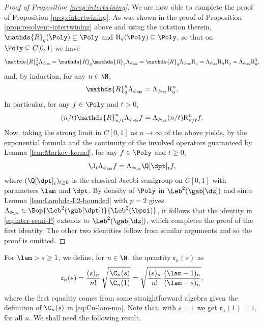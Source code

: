 \begin{proof}[Proof of Proposition \ref{prop:intertwining}]
We are now able to complete the proof of Proposition \ref{prop:intertwining}. As was shown in the proof of
Proposition \ref{prop:resolvent-intertwining} above and using the notation therein, $\mathds{R}_q(\Poly) \subseteq \Poly$ and $\mathrm{R}_q(\Poly) \subseteq \Poly$, so that on $\Poly \subseteq C[0,1]$ we have
\begin{equation*}
\mathds{R}_q^2 \Lambda_{\phi_{\dz}} = \mathds{R}_q\mathds{R}_q \Lambda_{\phi_{\dz}} = \mathds{R}_q \Lambda_{\phi_{\dz}} \mathrm{R}_q = \Lambda_{\phi_{\dz}} \mathrm{R}_q \mathrm{R}_q = \Lambda_{\phi_{\dz}} \mathrm{R}_q^2,
\end{equation*}
and, by induction, for any $n \in \N$,
\begin{equation*}
\mathds{R}_q^n \Lambda_{\phi_{\dz}} = \Lambda_{\phi_{\dz}} \mathrm{R}_q^n.
\end{equation*}
In particular, for any $f \in \Poly$ and $t > 0$,
\begin{equation*}
(n/t)\mathds{R}_{n/t}^n \Lambda_{\phi_{\dz}} f = \Lambda_{\phi_{\dz}} (n/t)\mathrm{R}_{n/t}^n f.
\end{equation*}
Now, taking the strong limit in $C[0,1]$ as $n\to\infty$ of the above yields, by the exponential formula \cite[Th.\,8.3]{pazy:1983} and the continuity of the involved operators guaranteed by Lemma \ref{lem:Markov-kernel}, for any $f \in \Poly$ and $t \geq 0$,
\begin{equation}
\label{eq:inter-semi-P}
\J_t \Lambda_{\phi_{\dz}} f = \Lambda_{\phi_{\dz}} \Q[\dpt]_t f,
\end{equation}
where $(\Q[\dpt]_t)_{t \geq 0}$ is the classical Jacobi semigroup on $C[0,1]$ with parameters $\lam$ and $\dpt$. By density of $\Poly$ in $\Leb^2(\gab[\dz])$ and since Lemma \ref{lem:Lambda-L2-bounded} with $p=2$ gives $\Lambda_{\phi_{\dz}} \in \Bop{\Leb^2(\gab[\dpt])}{\Leb^2(\bpsi)}$, it follows that the identity in \eqref{eq:inter-semi-P} extends to $\Leb^2(\gab[\dz])$, which completes the proof of the first identity. The other two identities follow from similar arguments and so the proof is omitted.
\end{proof}

For $\lam > s \geq 1$, we define, for $n \in \N$, the quantity $\mathfrak{c}_n(s)$ as
\begin{equation}
\label{eq:defn-cn}
\mathfrak{c}_n(s) = \frac{(s)_n}{n!}\, \sqrt{\frac{\C_n(s)}{\C_n(1)}} = \sqrt{\frac{(s)_n}{n!}\,\frac{(\lam-1)_n}{(\lam-s)_n}},
\end{equation}
where the first equality comes from some straightforward algebra given the definition of $\C_n(s)$ in \eqref{eq:Cn-lam-mo}. Note that, with $s=1$ we get $\mathfrak{c}_n(1) = 1$, for all $n$. We shall need the following result.

